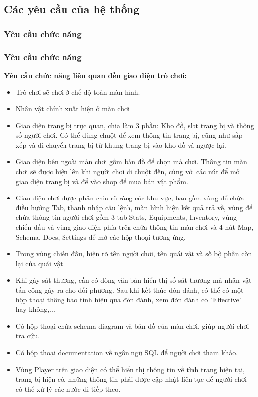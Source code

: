 \subsection{Các yêu cầu của hệ thống}
\subsubsection{Yêu cầu chức năng}
\subsubsection{Yêu cầu chức năng}
\textbf{Yêu cầu chức năng liên quan đến giao diện trò chơi:}
\begin{itemize}
	\item Trò chơi sẽ chơi ở chế độ toàn màn hình.
	\item Nhân vật chính xuất hiện ở màn chơi
	\item Giao diện trang bị trực quan, chia làm 3 phần: Kho đồ, slot trang bị và thông số người chơi. Có thể dùng chuột để xem thông tin trang bị, cũng như sắp xếp và di chuyển trang bị từ khung trang bị vào kho đồ và ngược lại.
	\item Giao diện bên ngoài màn chơi gồm bản đồ để chọn mà chơi. Thông tin màn chơi sẽ được hiện lên khi người chơi di chuột đến, cùng với các nút để mở giao diện trang bị và để vào shop để mua bán vật phẩm.
	\item Giao diện chơi được phân chia rõ ràng các khu vực, bao gồm vùng để chứa điều hướng Tab, thanh nhập câu lệnh, màn hình hiện kết quả trả về, vùng để chứa thông tin người chơi gồm 3 tab Stats, Equipments, Inventory, vùng chiến đấu và vùng giao diện phía trên chứa thông tin màn chơi và 4 nút Map, Schema, Docs, Settings để mở các hộp thoại tương ứng.
	\item Trong vùng chiến đấu, hiện rõ tên người chơi, tên quái vật và số bộ phần còn lại của quái vật.
	\item Khi gây sát thương, cần có dòng văn bản hiển thị số sát thương mà nhân vật tấn công gây ra cho đối phương. Sau khi kết thúc đòn đánh, có thể có một hộp thoại thông báo tính hiệu quả đòn đánh, xem đòn đánh có "Effective" hay không,...
	\item Có hộp thoại chứa schema diagram và bản đồ của màn chơi, giúp người chơi tra cứu.
	\item Có hộp thoại documentation về ngôn ngữ SQL để người chơi tham khảo.
	\item Vùng Player trên giao diện có thể hiển thị thông tin về tình trạng hiện tại, trang bị hiện có, những thông tin phải được cập nhật liên tục để người chơi có thể xử lý các nước đi tiếp theo.

\end{itemize}
